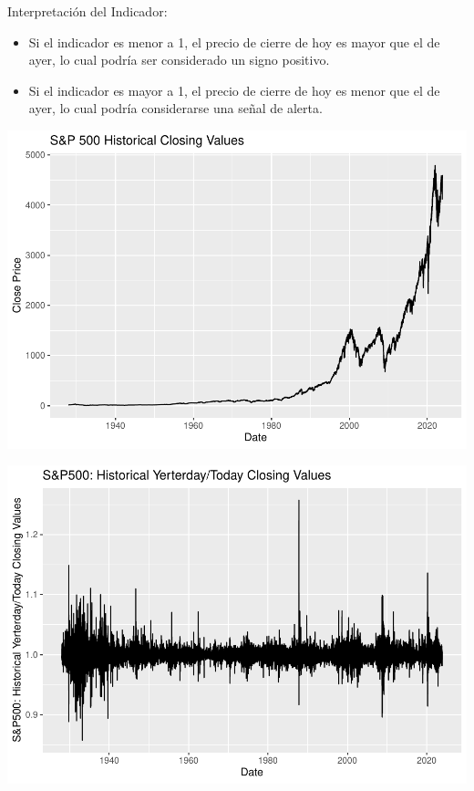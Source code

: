\documentclass[
  12pt]{article}
\begin{document}
Interpretación del Indicador:

\begin{itemize}
\item Si el indicador es menor a 1, el precio de cierre de hoy es mayor que el de ayer, lo cual podría ser considerado un signo positivo.
\item Si el indicador es mayor a 1, el precio de cierre de hoy es menor que el de ayer, lo cual podría considerarse una señal de alerta.
\end{itemize}

\vspace{1cm}

\includegraphics{extremales_files/figure-latex/unnamed-chunk-11-1.pdf}

\includegraphics{extremales_files/figure-latex/unnamed-chunk-12-1.pdf}
\newpage
\end{document}
